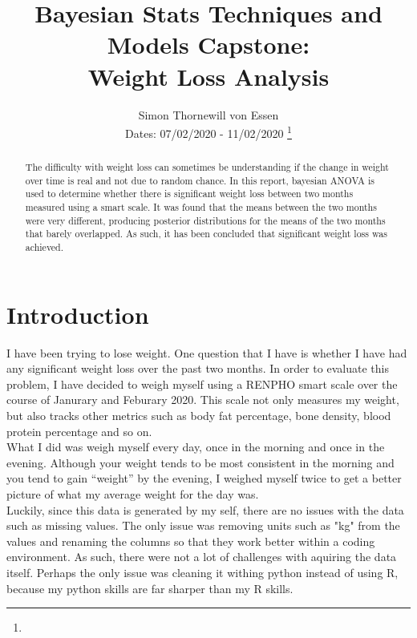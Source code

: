 \documentclass[journal, a4paper]{IEEEtran}
\begin{document}
	\title{Bayesian Stats Techniques and Models Capstone:\\ Weight Loss Analysis}
	\author{Simon Thornewill von Essen\\ Dates: 07/02/2020 - 11/02/2020
	\thanks{}}
	\markboth{}{}
	\maketitle


\begin{abstract}

The difficulty with weight loss can sometimes be understanding if the change in weight over time is real and not due to random chance. In this report, bayesian
ANOVA is used to determine whether there is significant weight loss between two months measured using a smart scale. It was found that the means between the two
months were very different, producing posterior distributions for the means of the two months that barely overlapped. As such, it has been concluded that 
significant weight loss was achieved.

\end{abstract}

\section{Introduction}
 I have been trying to lose weight. One question that I have is whether I have had any significant weight loss over the past two months.
In order to evaluate this problem, I have decided to weigh myself using a RENPHO smart scale over the course of Janurary and Feburary 2020. This scale not only
measures my weight, but also tracks other metrics such as body fat percentage, bone density, blood protein percentage and so on.\\ 

What I did was weigh myself every day, once in the morning and once in the evening. Although your weight tends to be most consistent in the morning and you
tend to gain ``weight'' by the evening, I weighed myself twice to get a better picture of what my average weight for the day was.\\

Luckily, since this data is generated by my self, there are no issues with the data such as missing values. The only issue was removing units such as "kg" from
the values and renaming the columns so that they work better within a coding environment. As such, there were not a lot of challenges with aquiring the data
itself. Perhaps the only issue was cleaning it withing python instead of using R, because my python skills are far sharper than my R skills.\\
	
\end{document}
